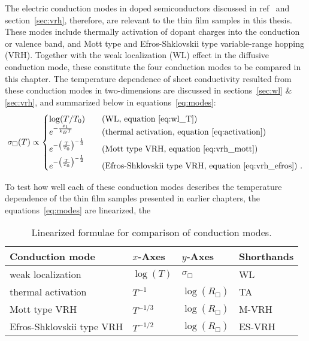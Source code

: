 The electric conduction modes in doped semiconductors discussed in ref~\cite{schklovskii_efros} and section~\ref{sec:vrh}, therefore, are relevant to the thin film samples in this thesis. These modes include thermally activation of dopant charges into the conduction or valence band, and Mott type and Efros-Shklovskii type variable-range hopping (VRH). Together with the weak localization (WL) effect in the diffusive conduction mode, these constitute the four conduction modes to be compared in this chapter. The temperature dependence of sheet conductivity resulted from these conduction modes in two-dimensions are discussed in sections~\ref{sec:wl} \& \ref{sec:vrh}, and summarized below in equations~\ref{eq:modes}:%
\begin{equation}\label{eq:modes}
    \sigma_\Box(T) \propto %
    \begin{cases}
        \log(T / T_0)  & \quad \text{(WL, equation~\ref{eq:wl_T})}\\
        e^{-\frac{\varepsilon_1}{k_B T}}   & \quad \text{(thermal activation, equation~\ref{eq:activation})}\\
        e^{-\left(\frac{T}{T_0}\right)^{-\frac{1}{3}}}   & \quad \text{(Mott type VRH, equation~\ref{eq:vrh_mott})}\\
        e^{-\left(\frac{T}{T_0}\right)^{-\frac{1}{2}}} & \quad \text{(Efros-Shklovskii type VRH, equation~\ref{eq:vrh_efros})}~.
    \end{cases}
\end{equation}%

To test how well each of these conduction modes describes the temperature dependence of the thin film samples presented in earlier chapters, the equations~\ref{eq:modes} are linearized, the 

\begin{table}[ht]
    \centering
    \begin{tabularx}{0.75\columnwidth}[t]{l|l|l|X}
    \caption[Linearized formulae for comparison of conduction modes]{Linearized formulae for comparison of conduction modes.}\\
		\hline\hline
        Conduction mode & $x$-Axes & $y$-Axes & Shorthands\\
        \hline%
        weak localization & $\log(T)$ & $\sigma_\Box$ & WL\\
        thermal activation & $T^{-1}$ & $\log\left(R_\Box\right)$ & TA\\
        Mott type VRH & $T^{-1/3}$ & $\log\left(R_\Box\right)$ & M-VRH\\
        Efros-Shklovskii type VRH & $T^{-1/2}$ & $\log\left(R_\Box\right)$ & ES-VRH\\
		\hline\hline
    \end{tabularx}
\end{table}
